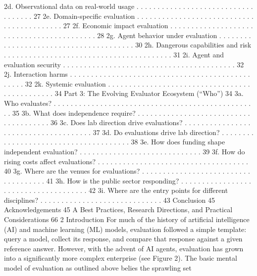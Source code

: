 2d. Observational data on real-world usage
. . . . . . . . . . . . . . . . . . . . . . . . . . . . . . . . . . . 27
2e. Domain-specific evaluation
. . . . . . . . . . . . . . . . . . . . . . . . . . . . . . . . . . . . . . . . . . 27
2f. Economic impact evaluation . . . . . . . . . . . . . . . . . . . . . . . . . . . . . . . . . . . . . . . . . . 28
2g. Agent behavior under evaluation . . . . . . . . . . . . . . . . . . . . . . . . . . . . . . . . . . . . . . . 30
2h. Dangerous capabilities and risk . . . . . . . . . . . . . . . . . . . . . . . . . . . . . . . . . . . . . . . . 31
2i. Agent and evaluation security . . . . . . . . . . . . . . . . . . . . . . . . . . . . . . . . . . . . . . . . . 32
2j. Interaction harms . . . . . . . . . . . . . . . . . . . . . . . . . . . . . . . . . . . . . . . . . . . . . . . . 32
2k. Systemic evaluation
. . . . . . . . . . . . . . . . . . . . . . . . . . . . . . . . . . . . . . . . . . . . . . 34
Part 3: The Evolving Evaluator Ecosystem (“Who”)
34
3a. Who evaluates? . . . . . . . . . . . . . . . . . . . . . . . . . . . . . . . . . . . . . . . . . . . . . . . . . 35
3b. What does independence require?
. . . . . . . . . . . . . . . . . . . . . . . . . . . . . . . . . . . . . . 36
3c. Does lab direction drive evaluations? . . . . . . . . . . . . . . . . . . . . . . . . . . . . . . . . . . . . . 37
3d. Do evaluations drive lab direction? . . . . . . . . . . . . . . . . . . . . . . . . . . . . . . . . . . . . . . 38
3e. How does funding shape independent evaluation?
. . . . . . . . . . . . . . . . . . . . . . . . . . . . . 39
3f. How do rising costs affect evaluations? . . . . . . . . . . . . . . . . . . . . . . . . . . . . . . . . . . . . 40
3g. Where are the venues for evaluations? . . . . . . . . . . . . . . . . . . . . . . . . . . . . . . . . . . . . 41
3h. How is the public sector responding? . . . . . . . . . . . . . . . . . . . . . . . . . . . . . . . . . . . . . 42
3i. Where are the entry points for different disciplines? . . . . . . . . . . . . . . . . . . . . . . . . . . . . . 43
Conclusion
45
Acknowledgements
45
A
Best Practices, Research Directions, and Practical Considerations
66
2
Introduction
For much of the history of artificial intelligence (AI) and machine learning (ML) models, evaluation followed
a simple template: query a model, collect its response, and compare that response against a given reference
answer. However, with the advent of AI agents, evaluation has grown into a significantly more complex
enterprise (see Figure 2). The basic mental model of evaluation as outlined above belies the sprawling set
